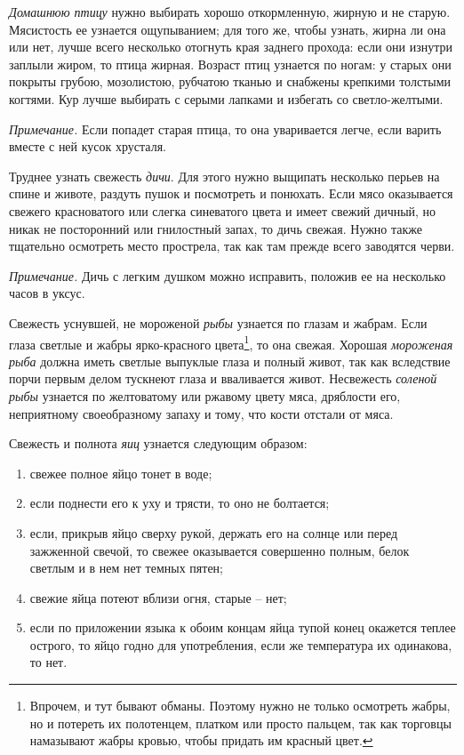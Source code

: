 \emph{Домашнюю птицу} нужно выбирать хорошо откормленную, жирную и не старую. Мясистость ее узнается ощупыванием; для того же, чтобы узнать, жирна ли она или нет, лучше всего несколько отогнуть края заднего прохода: если они изнутри заплыли жиром, то птица жирная. Возраст птиц узнается по ногам: у старых они покрыты грубою, мозолистою, рубчатою тканью и снабжены крепкими толстыми когтями. Кур лучше выбирать с серыми лапками и избегать со светло-желтыми.

 \emph{Примечание.} Если попадет старая птица, то она уваривается легче, если варить вместе с ней кусок хрусталя.

Труднее узнать свежесть \emph{дичи}. Для этого нужно выщипать несколько перьев на спине и животе, раздуть пушок и посмотреть и понюхать. Если мясо оказывается свежего красноватого или слегка синеватого цвета и имеет свежий дичный, но никак не посторонний или гнилостный запах, то дичь свежая. Нужно также тщательно осмотреть место прострела, так как там прежде всего заводятся черви.

 \emph{Примечание.} Дичь с легким душком можно исправить, положив ее на несколько часов в уксус.

Свежесть уснувшей, не мороженой \emph{рыбы} узнается по глазам и жабрам. Если глаза светлые и жабры ярко-красного цвета\footnote{Впрочем, и тут бывают обманы. Поэтому нужно не только осмотреть жабры, но и потереть их полотенцем, платком или просто пальцем, так как торговцы намазывают жабры кровью, чтобы придать им красный цвет.}, то она свежая. Хорошая \emph{мороженая рыба} должна иметь светлые выпуклые глаза и полный живот, так как вследствие порчи первым делом тускнеют глаза и вваливается живот. Несвежесть \emph{соленой рыбы} узнается по желтоватому или ржавому цвету мяса, дряблости его, неприятному своеобразному запаху и тому, что кости отстали от мяса.

Свежесть и полнота \emph{яиц} узнается следующим образом:

\begin{enumerate}
	\item свежее полное яйцо тонет в воде;
	\item если поднести его к уху и трясти, то оно не болтается;
    \item если, прикрыв яйцо сверху рукой, держать его на солнце или перед зажженной свечой, то свежее оказывается совершенно полным, белок светлым и в нем нет темных пятен;
    \item свежие яйца потеют вблизи огня, старые – нет;
    \item если по приложении языка к обоим концам яйца тупой конец окажется теплее острого, то яйцо годно для употребления, если же температура их одинакова, то нет.
\end{enumerate}

